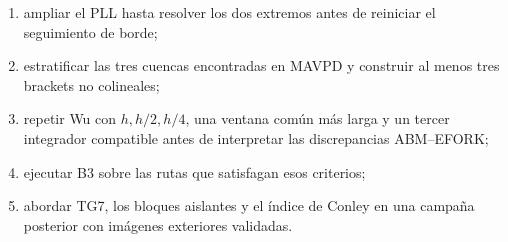 \begin{enumerate}
 \item ampliar el PLL hasta resolver los dos extremos antes de reiniciar el
 seguimiento de borde;
 \item estratificar las tres cuencas encontradas en MAVPD y construir al menos
 tres brackets no colineales;
 \item repetir Wu con $h,h/2,h/4$, una ventana común más larga y un tercer
 integrador compatible antes de interpretar las discrepancias ABM--EFORK;
 \item ejecutar B3 sobre las rutas que satisfagan esos criterios;
 \item abordar TG7, los bloques aislantes y el índice de Conley en una campaña
 posterior con imágenes exteriores validadas.
\end{enumerate}
